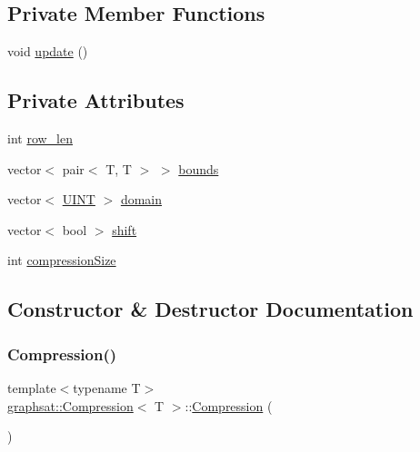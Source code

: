 \subsection*{Private Member Functions}
\begin{DoxyCompactItemize}
\item 
void \mbox{\hyperlink{classgraphsat_1_1_compression_aaf2178a46a2874f7c91b59587f199ecf}{update}} ()
\end{DoxyCompactItemize}
\subsection*{Private Attributes}
\begin{DoxyCompactItemize}
\item 
int \mbox{\hyperlink{classgraphsat_1_1_compression_ab71058988fdbfd50b76c22a77b06958b}{row\+\_\+len}}
\item 
vector$<$ pair$<$ T, T $>$ $>$ \mbox{\hyperlink{classgraphsat_1_1_compression_a3c87e36e0cd103f8a22cbffbaa6fd2fd}{bounds}}
\item 
vector$<$ \mbox{\hyperlink{namespacegraphsat_aa3b3d61a8c27ffc03448c5e1f3a76aed}{U\+I\+NT}} $>$ \mbox{\hyperlink{classgraphsat_1_1_compression_adc029dd41948979ddafd6b5e078a8de4}{domain}}
\item 
vector$<$ bool $>$ \mbox{\hyperlink{classgraphsat_1_1_compression_af12d77b61709511dfdf1fe3060ef98b8}{shift}}
\item 
int \mbox{\hyperlink{classgraphsat_1_1_compression_aca1c781ad7505b1d19829fcba69b42fb}{compression\+Size}}
\end{DoxyCompactItemize}


\subsection{Constructor \& Destructor Documentation}
\mbox{\label{classgraphsat_1_1_compression_a07c8f8c5cfa98228b0a03c2f21d6ac44}} 
\subsubsection{\texorpdfstring{Compression()}{Compression()}\hspace{0.1cm}{\footnotesize\ttfamily [1/2]}}
{\footnotesize\ttfamily template$<$typename T$>$ \\
\mbox{\hyperlink{classgraphsat_1_1_compression}{graphsat\+::\+Compression}}$<$ T $>$\+::\mbox{\hyperlink{classgraphsat_1_1_compression}{Compression}} (\begin{DoxyParamCaption}{ }\end{DoxyParamCaption})\hspace{0.3cm}{\ttfamily [inline]}}

